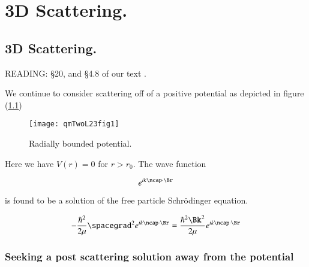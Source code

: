 %
%

\chapter{3D Scattering.}
\label{chap:qmTwoL23}
{}
\date{Nov 30, 2011}

\beginArtWithToc

%
%
\section{3D Scattering.}

READING: \S 20, and \S 4.8 of our text \cite{desai2009quantum}.

We continue to consider scattering off of a positive potential as depicted in figure (\ref{fig:qmTwoL23:qmTwoL23fig1})
\begin{figure}[htp]
   \centering
   \texttt{[image: qmTwoL23fig1]}
   \caption{Radially bounded potential.}\label{fig:qmTwoL23:qmTwoL23fig1}
\end{figure}

Here we have $V(r) = 0$ for $r > r_0$.  The wave function

\begin{equation}\label{eqn:qmTwoL23:20}
e^{i k \ncap \cdot \Br}
\end{equation}

is found to be a solution of the free particle Schr\"{o}dinger equation.

\begin{equation}\label{eqn:qmTwoL23:40}
- \frac{\hbar^2}{2\mu} \spacegrad^2
e^{i k \ncap \cdot \Br}
 = \frac{\hbar^2 \Bk^2}{2 \mu}
e^{i k \ncap \cdot \Br}
\end{equation}

\subsection{Seeking a post scattering solution away from the potential}

